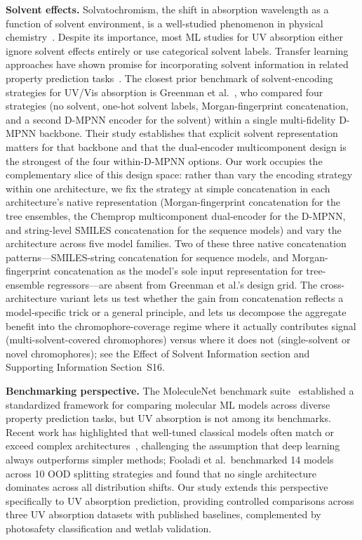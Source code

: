 \documentclass[journal=jcisd8,manuscript=article]{achemso}
\begin{document}
\textbf{Solvent effects.}
Solvatochromism, the shift in absorption wavelength as a function of solvent environment, is a well-studied phenomenon in physical chemistry~\cite{reichardt2011solvents}.
Despite its importance, most ML studies for UV absorption either ignore solvent effects entirely or use categorical solvent labels.
Transfer learning approaches have shown promise for incorporating solvent information in related property prediction tasks~\cite{vermeire2021transfer}. The closest prior benchmark of solvent-encoding strategies for UV/Vis absorption is Greenman et al.~\cite{greenman2022multifidelity}, who compared four strategies (no solvent, one-hot solvent labels, Morgan-fingerprint concatenation, and a second D-MPNN encoder for the solvent) within a single multi-fidelity D-MPNN backbone. Their study establishes that explicit solvent representation matters for that backbone and that the dual-encoder multicomponent design is the strongest of the four within-D-MPNN options. Our work occupies the complementary slice of this design space: rather than vary the encoding strategy within one architecture, we fix the strategy at simple concatenation in each architecture's native representation (Morgan-fingerprint concatenation for the tree ensembles, the Chemprop multicomponent dual-encoder for the D-MPNN, and string-level SMILES concatenation for the sequence models) and vary the architecture across five model families. Two of these three native concatenation patterns---SMILES-string concatenation for sequence models, and Morgan-fingerprint concatenation as the model's sole input representation for tree-ensemble regressors---are absent from Greenman et al.'s design grid. The cross-architecture variant lets us test whether the gain from concatenation reflects a model-specific trick or a general principle, and lets us decompose the aggregate benefit into the chromophore-coverage regime where it actually contributes signal (multi-solvent-covered chromophores) versus where it does not (single-solvent or novel chromophores); see the Effect of Solvent Information section and Supporting Information Section~S16.

\textbf{Benchmarking perspective.}
The MoleculeNet benchmark suite~\cite{wuMoleculeNet2018} established a standardized framework for comparing molecular ML models across diverse property prediction tasks, but UV absorption is not among its benchmarks.
Recent work has highlighted that well-tuned classical models often match or exceed complex architectures~\cite{panapitiya2022evaluation, walters2021applications, fooladi2025evaluating}, challenging the assumption that deep learning always outperforms simpler methods; Fooladi et al.\ benchmarked 14 models across 10 OOD splitting strategies and found that no single architecture dominates across all distribution shifts.
Our study extends this perspective specifically to UV absorption prediction, providing controlled comparisons across three UV absorption datasets with published baselines, complemented by photosafety classification and wetlab validation.
\end{document}
